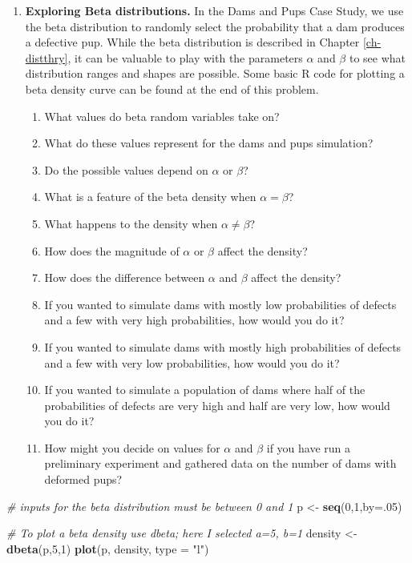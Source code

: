 \documentclass[
]{krantz}
\newenvironment{Shaded}{\begin{snugshade}}{\end{snugshade}}
\newcommand{\CommentTok}[1]{\textcolor[rgb]{0.37,0.37,0.37}{\textit{#1}}}
\newcommand{\DataTypeTok}[1]{\textcolor[rgb]{0.27,0.27,0.27}{#1}}
\newcommand{\DecValTok}[1]{\textcolor[rgb]{0.06,0.06,0.06}{#1}}
\newcommand{\KeywordTok}[1]{\textcolor[rgb]{0.27,0.27,0.27}{\textbf{#1}}}
\newcommand{\NormalTok}[1]{#1}
\newcommand{\StringTok}[1]{\textcolor[rgb]{0.5,0.5,0.5}{#1}}
\providecommand{\tightlist}{%
  \setlength{\itemsep}{0pt}\setlength{\parskip}{0pt}}
\begin{document}
\begin{enumerate}
\def\labelenumi{\arabic{enumi}.}
\item
  \textbf{Exploring Beta distributions.} In the Dams and Pups Case Study, we use the beta distribution to randomly select the probability that a dam produces a defective pup. While the beta distribution is described in Chapter \ref{ch-distthry}, it can be valuable to play with the parameters \(\alpha\) and \(\beta\) to see what distribution ranges and shapes are possible. Some basic R code for plotting a beta density curve can be found at the end of this problem.

  \begin{enumerate}
  \def\labelenumii{\alph{enumii}.}
  \tightlist
  \item
    What values do beta random variables take on?
  \item
    What do these values represent for the dams and pups simulation?
  \item
    Do the possible values depend on \(\alpha\) or \(\beta\)?
  \item
    What is a feature of the beta density when \(\alpha=\beta\)?
  \item
    What happens to the density when \(\alpha \neq \beta\)?
  \item
    How does the magnitude of \(\alpha\) or \(\beta\) affect the density?
  \item
    How does the difference between \(\alpha\) and \(\beta\) affect the density?
  \item
    If you wanted to simulate dams with mostly low probabilities of defects and a few with very high probabilities, how would you do it?
  \item
    If you wanted to simulate dams with mostly high probabilities of defects and a few with very low probabilities, how would you do it?
  \item
    If you wanted to simulate a population of dams where half of the probabilities of defects are very high and half are very low, how would you do it?
  \item
    How might you decide on values for \(\alpha\) and \(\beta\) if you have run a preliminary experiment and gathered data on the number of dams with deformed pups?
  \end{enumerate}
\end{enumerate}

\begin{Shaded}
\begin{Highlighting}[]
\CommentTok{# inputs for the beta distribution must be between 0 and 1}
\NormalTok{p <-}\StringTok{ }\KeywordTok{seq}\NormalTok{(}\DecValTok{0}\NormalTok{,}\DecValTok{1}\NormalTok{,}\DataTypeTok{by=}\NormalTok{.}\DecValTok{05}\NormalTok{)  }

\CommentTok{# To plot a beta density use dbeta; here I selected a=5, b=1}
\NormalTok{density <-}\StringTok{ }\KeywordTok{dbeta}\NormalTok{(p,}\DecValTok{5}\NormalTok{,}\DecValTok{1}\NormalTok{)}
\KeywordTok{plot}\NormalTok{(p, density, }\DataTypeTok{type =} \StringTok{"l"}\NormalTok{)}
\end{Highlighting}
\end{Shaded}
\end{document}
